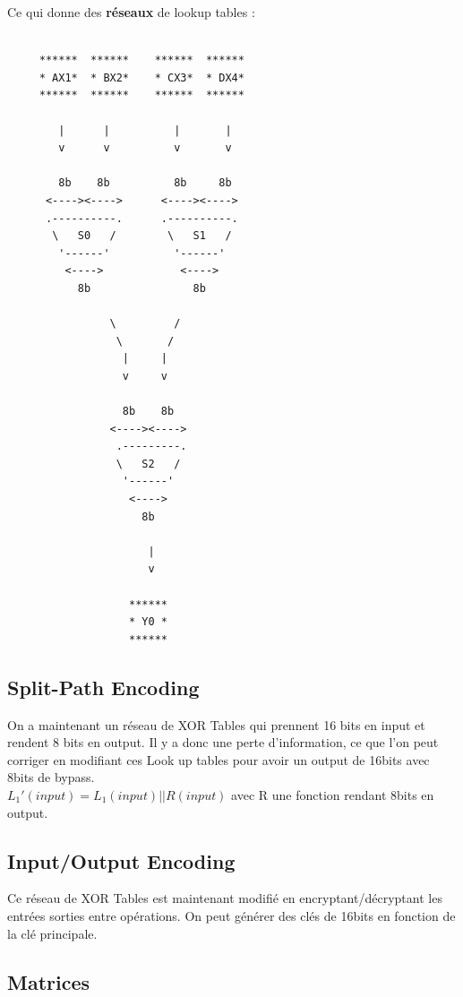 \documentclass[a4paper,12pt]{article}
\begin{document}
Ce qui donne des \textbf{réseaux} de lookup tables :\\

\begin{Verbatim}[samepage=true]

     ******  ******    ******  ******
     * AX1*  * BX2*    * CX3*  * DX4*
     ******  ******    ******  ******

        |      |          |       |
        v      v          v       v

        8b    8b          8b     8b
      <----><---->      <----><---->
      .----------.      .----------.
       \   S0   /        \   S1   /
        '------'          '------'
         <---->            <---->
           8b                8b

                \         /
                 \       /
                  |     |
                  v     v

                  8b    8b
                <----><---->
                 .---------.
                 \   S2   /
                  '------'
                   <---->
                     8b

                      |
                      v

                   ******
                   * Y0 *
                   ******

\end{Verbatim}

\subsection{Split-Path Encoding}

On a maintenant un réseau de XOR Tables qui prennent 16 bits en input et rendent 8 bits en output. Il y a donc une perte d'information, ce que l'on peut corriger en modifiant ces Look up tables pour avoir un output de 16bits avec 8bits de bypass.\\
$L_1'(input) = L_1(input)||R(input)$ avec R une fonction rendant 8bits en output.
 
\subsection{Input/Output Encoding}

Ce réseau de XOR Tables est maintenant modifié en encryptant/décryptant les entrées sorties entre opérations. On peut générer des clés de 16bits en fonction de la clé principale.

\subsection{Matrices}
\end{document}
